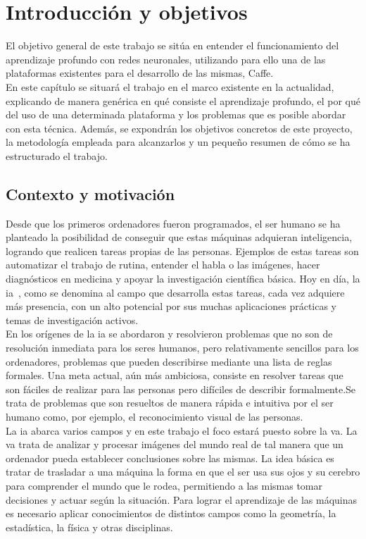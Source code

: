 \chapter{Introducción y objetivos}\label{cap.introduccion}
El objetivo general de este trabajo se sitúa en  entender el funcionamiento del aprendizaje profundo con redes neuronales, utilizando para ello una de las plataformas existentes para el desarrollo de las mismas, Caffe.\\

En este capítulo se situará el trabajo en el marco existente en la actualidad, explicando de manera genérica en qué consiste el aprendizaje profundo, el por qué del uso de una determinada plataforma y los problemas que es posible abordar con esta técnica. Además, se expondrán los objetivos concretos de este proyecto, la metodología empleada para alcanzarlos y un pequeño resumen de cómo se ha estructurado el trabajo.

\section{Contexto y motivación}

Desde que los primeros ordenadores fueron programados, el ser humano se ha planteado la posibilidad de conseguir que estas máquinas adquieran inteligencia, logrando que realicen tareas propias de las personas. Ejemplos de estas tareas son automatizar el trabajo de rutina, entender el habla o las imágenes, hacer diagnósticos en medicina y apoyar la investigación científica básica. Hoy en día, la \acrfull{ia}~\cite{Goodfellow-et-al-2016}, como se denomina al campo que desarrolla estas tareas, cada vez adquiere más presencia, con un alto potencial por sus muchas aplicaciones prácticas y temas de investigación activos.\\

En los orígenes de la \acrshort{ia} se abordaron y resolvieron problemas que no son de resolución inmediata para los seres humanos, pero relativamente sencillos para los ordenadores, problemas que pueden describirse mediante una lista de reglas formales. Una meta actual, aún más ambiciosa, consiste en resolver tareas que son fáciles de realizar para las personas pero difíciles de describir formalmente.Se trata de problemas que son resueltos de manera rápida e intuitiva por el ser humano como, por ejemplo, el reconocimiento visual de las personas.\\

La \acrshort{ia} abarca varios campos y en este trabajo el foco estará puesto sobre la \acrfull{va}. La \acrshort{va} trata de analizar y procesar imágenes del mundo real de tal manera que un ordenador pueda establecer conclusiones sobre las mismas. La idea básica es tratar de trasladar a una máquina la forma en que el ser usa sus ojos y su cerebro para comprender el mundo que le rodea, permitiendo a las mismas tomar decisiones y actuar según la situación. Para lograr el aprendizaje de las máquinas es necesario aplicar conocimientos de distintos campos como la geometría, la estadística, la física y otras disciplinas.\\

